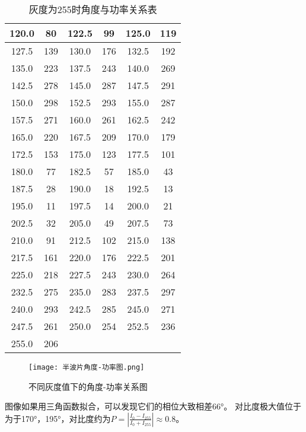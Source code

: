 \documentclass{whureport}
\begin{document}
\begin{multicols}{2}
\begin{table}[H]
\begin{tabular}{|c|c|c|c|c|c|}
\hline
120.0 & 80 & 122.5 & 99 & 125.0 & 119 \\
\hline
127.5 & 139 & 130.0 & 176 & 132.5 & 192 \\
\hline
135.0 & 223 & 137.5 & 243 & 140.0 & 269 \\
\hline
142.5 & 278 & 145.0 & 287 & 147.5 & 291 \\
\hline
150.0 & 298 & 152.5 & 293 & 155.0 & 287 \\
\hline
157.5 & 271 & 160.0 & 261 & 162.5 & 242 \\
\hline
165.0 & 220 & 167.5 & 209 & 170.0 & 179 \\
\hline
172.5 & 153 & 175.0 & 123 & 177.5 & 101 \\
\hline
180.0 & 77 & 182.5 & 57 & 185.0 & 43 \\
\hline
187.5 & 28 & 190.0 & 18 & 192.5 & 13 \\
\hline
195.0 & 11 & 197.5 & 14 & 200.0 & 21 \\
\hline
202.5 & 32 & 205.0 & 49 & 207.5 & 73 \\
\hline
210.0 & 91 & 212.5 & 102 & 215.0 & 138 \\
\hline
217.5 & 161 & 220.0 & 176 & 222.5 & 201 \\
\hline
225.0 & 218 & 227.5 & 243 & 230.0 & 264 \\
\hline
232.5 & 275 & 235.0 & 283 & 237.5 & 297 \\
\hline
240.0 & 293 & 242.5 & 285 & 245.0 & 271 \\
\hline
247.5 & 261 & 250.0 & 254 & 252.5 & 236 \\
\hline
255.0 & 206 &  &  &  &  \\
\hline
\end{tabular}
        \caption{灰度为255时角度与功率关系表}
        \label{tab:angle-power-relation}
        \end{table}

        \begin{figure}[H]
            \centering
            \texttt{[image: 半波片角度-功率图.png]}
            \caption{不同灰度值下的角度-功率关系图}
            \label{fig:angle-power-relation}
            \end{figure}
图像如果用三角函数拟合，可以发现它们的相位大致相差66°。
对比度极大值位于为于170°，195°，对比度约为$P=|\frac{I_0-I_{255}}{I_0+I_{255}}|\approx 0.8$。



\end{multicols}
\end{document}

